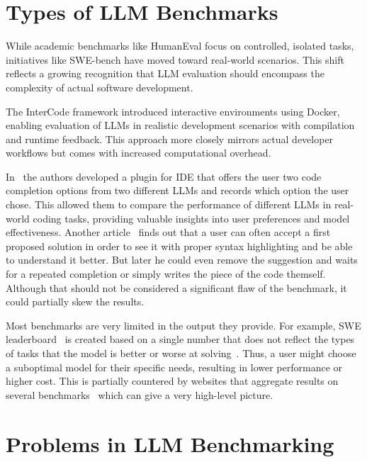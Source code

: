 \section{Types of LLM Benchmarks}


While academic benchmarks like HumanEval focus on controlled, isolated tasks, initiatives like SWE-bench \cite{jimenez2024swebenchlanguagemodelsresolve} have moved toward real-world scenarios. This shift reflects a growing recognition that LLM evaluation should encompass the complexity of actual software development.

The InterCode framework \cite{yang2023intercodestandardizingbenchmarkinginteractive} introduced interactive environments using Docker, enabling evaluation of LLMs in realistic development scenarios with compilation and runtime feedback. This approach more closely mirrors actual developer workflows but comes with increased computational overhead.

In~\cite{chi2025copilotarenaplatformcode} the authors developed a plugin for IDE that offers the user two code completion options from two different LLMs and records which option the user chose. This allowed them to compare the performance of different LLMs in real-world coding tasks, providing valuable insights into user preferences and model effectiveness.
Another article~\cite{mozannar2024readinglinesmodelinguser} finds out that a user can often accept a first proposed solution in order to see it with proper syntax highlighting and be able to understand it better. But later he could even remove the suggestion and waits for a repeated completion or simply writes the piece of the code themself. Although that should not be considered a significant flaw of the benchmark, it could partially skew the results.

Most benchmarks are very limited in the output they provide. For example, SWE leaderboard~\cite{swebenchSWEbenchLeaderboards} is created based on a single number that does not reflect the types of tasks that the model is better or worse at solving~\cite{miah2024usercentricevaluationcode}. Thus, a user might choose a suboptimal model for their specific needs, resulting in lower performance or higher cost. This is partially countered by websites that aggregate results on several benchmarks~\cite{vellumLeaderboard2025} which can give a very high-level picture.

\section{Problems in LLM Benchmarking}


